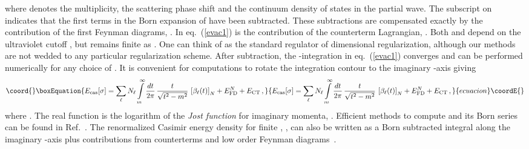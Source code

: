 \documentclass[a4paper,aps,amsfonts,prl,showpacs,nobibnotes,nofootinbib,%
tightenlines,twocolumn]{revtex4}
\providecommand{\vek}[1]{\mathbf{#1}}
\begin{document}
where \coordHE{} denotes the multiplicity, \myHighlight{$\delta_{\ell}$}\coordHE{} the
scattering phase shift and \coordHE{}
the continuum density of states in the \coordHE{} partial wave. 
The subscript \coordHE{} on \myHighlight{$\delta_{\ell}$}\coordHE{} indicates that the first \coordHE{}
terms in the Born expansion of \myHighlight{$\delta_{\ell}$}\coordHE{} have been subtracted. 
These subtractions are compensated exactly by the contribution of the
first \coordHE{} Feynman diagrams, \coordHE{}.  In eq.~(\ref{evac1}) \coordHE{} is the contribution of
the counterterm Lagrangian, \coordHE{}.  Both \coordHE{} and \coordHE{} depend on the ultraviolet cutoff \coordHE{},
but \coordHE{} remains finite as \coordHE{}. 
One can think of \myHighlight{$\epsilon$}\coordHE{} as the standard regulator of dimensional
regularization, although our methods are not wedded to any particular
regularization scheme.  After subtraction, the \coordHE{}-integration in
eq.~(\ref{evac1}) converges and can be performed numerically for any
choice of \myHighlight{$\sigma(\vek x)$}\coordHE{}.  It is convenient for computations to
rotate the integration contour to the imaginary \coordHE{}-axis giving
%
\begin{equation}\coord{}\boxEquation{
E_{\rm cas}[\sigma]=\sum\limits_{\ell} N_\ell \int\limits_m^\infty
\frac{d t}{2\pi}\,\frac{t}{\sqrt{t^2-m^2}}\,
\left[\beta_\ell(t)\right]_{N}
+ E_{\rm FD}^{N} + E_{\rm CT} \,,
\label{master}
}{
E_{\rm cas}[\sigma]=\sum\limits_{\ell} N_\ell \int\limits_m^\infty
\frac{d t}{2\pi}\,\frac{t}{\sqrt{t^2-m^2}}\,
\left[\beta_\ell(t)\right]_{N}
+ E_{\rm FD}^{N} + E_{\rm CT} \,,
}{ecuacion}\coordE{}\end{equation}
%
where \coordHE{}.  The real function \coordHE{} is
the logarithm of the \emph{Jost function} for imaginary momenta,
\coordHE{}.  Efficient methods to compute
\coordHE{} and its Born series can be found in Ref.~\cite{dens}. 
The renormalized Casimir energy density for finite \myHighlight{$\lambda$}\coordHE{},
\myHighlight{$\epsilon_{\rm cas}(\vek x)$}\coordHE{}, can also be written as a Born subtracted
integral along the imaginary \coordHE{}-axis plus contributions from
counterterms and low order Feynman diagrams~\cite{dens}.
\end{document}
